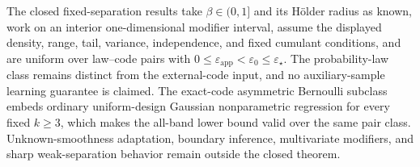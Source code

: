 \documentclass{article}
\begin{document}
The closed fixed-separation results take \(\beta\in(0,1]\) and its Hölder radius as known, work on an interior one-dimensional modifier interval, assume the displayed density, range, tail, variance, independence, and fixed cumulant conditions, and are uniform over law--code pairs with \(0\le\varepsilon_{\mathrm{app}}<\varepsilon_0\le\varepsilon_\star\).  The probability-law class remains distinct from the external-code input, and no auxiliary-sample learning guarantee is claimed.  The exact-code asymmetric Bernoulli subclass embeds ordinary uniform-design Gaussian nonparametric regression for every fixed \(k\ge3\), which makes the all-band lower bound valid over the same pair class.  Unknown-smoothness adaptation, boundary inference, multivariate modifiers, and sharp weak-separation behavior remain outside the closed theorem.
\end{document}

